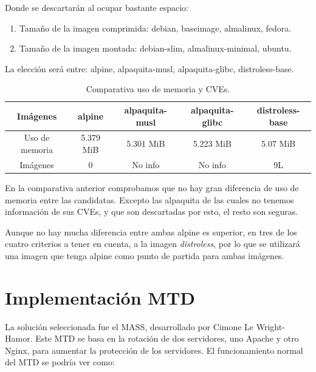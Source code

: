 Donde se descartarán al ocupar bastante espacio:
\begin{enumerate}
    \item Tamaño de la imagen comprimida: debian, baseimage, almalinux, fedora.
    \item Tamaño de la imagen montada: debian-slim, almalinux-minimal, ubuntu.
\end{enumerate}

La elección será entre: alpine, alpaquita-musl, alpaquita-glibc, distroless-base.

\begin{table}[H]
    \centering
    \begin{adjustbox}{width=\textwidth, totalheight=\textheight, keepaspectratio}
        \begin{tabular}{|c|c|c|c|c|}
        \hline
        Imágenes & alpine & alpaquita-musl & alpaquita-glibc & distroless-base \\
        \hline
        Uso de memoria & 5.379 MiB & 5.301 MiB & 5.223 MiB & 5.07 MiB \\
        \hline
        Imágenes & 0 & No info & No info & 9L \\
        \end{tabular}
    \end{adjustbox}
    \caption{Comparativa uso de memoria y CVEs.}
\end{table}

En la comparativa anterior comprobamos que no hay gran diferencia de uso de memoria entre las candidatas. Excepto las alpaquita de las cuales no tenemos información de sus CVEs, y que son descartadas por esto, el resto son seguras.

Aunque no hay mucha diferencia entre ambas alpine es superior, en tres de los cuatro criterios a tener en cuenta, a la imagen \textit{distroless}, por lo que se utilizará una imagen que tenga alpine como punto de partida para ambas imágenes. 

\section{Implementación MTD}
La solución seleccionada fue el MASS, desarrollado por Cimone Le Wright-Hamor. Este MTD se basa en la rotación de dos servidores, uno Apache y otro Nginx, para aumentar la protección de los servidores. El funcionamiento normal del MTD se podría ver como:


